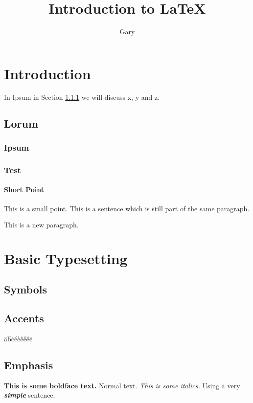 \documentclass[a4paper]{article}
\title{Introduction to \LaTeX}
\author{Gary}
\begin{document}
\maketitle	

\begin{abstract}
	\lipsum[1]
\end{abstract}

\tableofcontents

\section{Introduction}
In Ipsum in Section \ref{sec:ipsum} we will discuss x, y and z. 
\subsection{Lorum}
\lipsum
\subsubsection{Ipsum}\label{sec:ipsum}
\subsubsection{Test}
\lipsum[1]

\paragraph{Short Point}
This is a small point. This is 
a sentence which is still part of the same paragraph. 

This is a new paragraph. 

\section{Basic Typesetting}
\subsection{Symbols}
\EUR \EURhv

\subsection{Accents}
\"{a}\H{b}\.{c}\'{e}\`{e}\^{e}\v{e}\u{e}\={e}

\subsection{Emphasis}
\textbf{This is some boldface text.} Normal text. \textit{This is some italics.} Using a very \textbf{\textit{simple}} sentence. 
\end{document}
